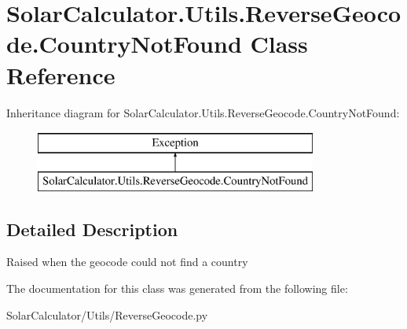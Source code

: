 \hypertarget{class_solar_calculator_1_1_utils_1_1_reverse_geocode_1_1_country_not_found}{\section{Solar\-Calculator.\-Utils.\-Reverse\-Geocode.\-Country\-Not\-Found Class Reference}
\label{class_solar_calculator_1_1_utils_1_1_reverse_geocode_1_1_country_not_found}
}
Inheritance diagram for Solar\-Calculator.\-Utils.\-Reverse\-Geocode.\-Country\-Not\-Found\-:\begin{figure}[H]
\begin{center}
\leavevmode
\includegraphics[height=2.000000cm]{class_solar_calculator_1_1_utils_1_1_reverse_geocode_1_1_country_not_found}
\end{center}
\end{figure}


\subsection{Detailed Description}
\begin{DoxyVerb}Raised when the geocode could not find a country\end{DoxyVerb}
 

The documentation for this class was generated from the following file\-:\begin{DoxyCompactItemize}
\item 
Solar\-Calculator/\-Utils/Reverse\-Geocode.\-py\end{DoxyCompactItemize}
